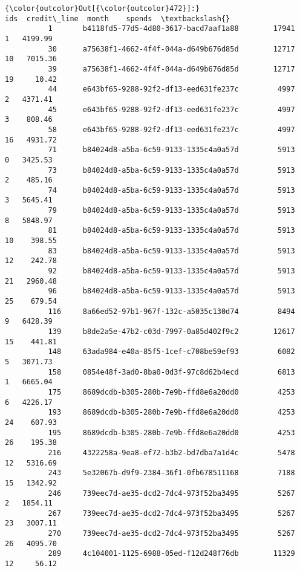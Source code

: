 \documentclass[11pt]{article}
\begin{document}
\begin{Verbatim}[commandchars=\\\{\}]
{\color{outcolor}Out[{\color{outcolor}472}]:}                                          ids  credit\_line  month    spends  \textbackslash{}
          1       b4118fd5-77d5-4d80-3617-bacd7aaf1a88        17941      1   4199.99   
          30      a75638f1-4662-4f4f-044a-d649b676d85d        12717     10   7015.36   
          39      a75638f1-4662-4f4f-044a-d649b676d85d        12717     19     10.42   
          44      e643bf65-9288-92f2-df13-eed631fe237c         4997      2   4371.41   
          45      e643bf65-9288-92f2-df13-eed631fe237c         4997      3    808.46   
          58      e643bf65-9288-92f2-df13-eed631fe237c         4997     16   4931.72   
          71      b84024d8-a5ba-6c59-9133-1335c4a0a57d         5913      0   3425.53   
          73      b84024d8-a5ba-6c59-9133-1335c4a0a57d         5913      2    485.16   
          74      b84024d8-a5ba-6c59-9133-1335c4a0a57d         5913      3   5645.41   
          79      b84024d8-a5ba-6c59-9133-1335c4a0a57d         5913      8   5848.97   
          81      b84024d8-a5ba-6c59-9133-1335c4a0a57d         5913     10    398.55   
          83      b84024d8-a5ba-6c59-9133-1335c4a0a57d         5913     12    242.78   
          92      b84024d8-a5ba-6c59-9133-1335c4a0a57d         5913     21   2960.48   
          96      b84024d8-a5ba-6c59-9133-1335c4a0a57d         5913     25    679.54   
          116     8a66ed52-97b1-967f-132c-a5035c130d74         8494      9   6428.39   
          139     b8de2a5e-47b2-c03d-7997-0a85d402f9c2        12617     15    441.81   
          148     63ada984-e40a-85f5-1cef-c708be59ef93         6082      5   3071.73   
          158     0854e48f-3ad0-8ba0-0d3f-97c8d62b4ecd         6813      1   6665.04   
          175     8689dcdb-b305-280b-7e9b-ffd8e6a20dd0         4253      6   4226.17   
          193     8689dcdb-b305-280b-7e9b-ffd8e6a20dd0         4253     24    607.93   
          195     8689dcdb-b305-280b-7e9b-ffd8e6a20dd0         4253     26    195.38   
          216     4322258a-9ea8-ef72-b3b2-bd7dba7a1d4c         5478     12   5316.69   
          243     5e32067b-d9f9-2384-36f1-0fb678511168         7188     15   1342.92   
          246     739eec7d-ae35-dcd2-7dc4-973f52ba3495         5267      2   1854.11   
          267     739eec7d-ae35-dcd2-7dc4-973f52ba3495         5267     23   3007.11   
          270     739eec7d-ae35-dcd2-7dc4-973f52ba3495         5267     26   4095.70   
          289     4c104001-1125-6988-05ed-f12d248f76db        11329     12     56.12   

\end{Verbatim}
\end{document}
